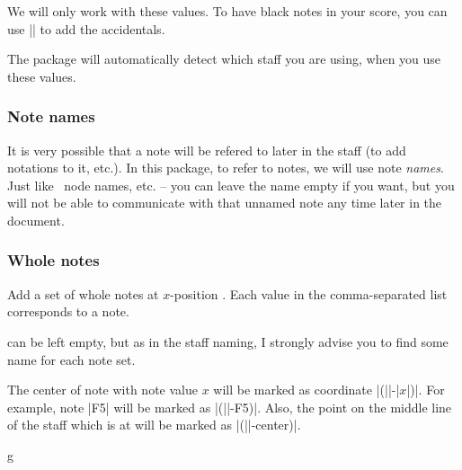 We will only work with these values. To have black notes in your score, you can 
use |\tmappendaccidental| to add the accidentals.

The package will automatically detect which staff you are using, when you use 
these values.
\subsubsection{Note names}\label{sec:music-notes:commands:note-names}
It is very possible that a note will be refered to later in the staff (to add 
notations to it, etc.). In this package, to refer to notes, we will use note 
\emph{names}. Just like \tikzname\ node names, etc. -- you can leave the name 
empty if you want, but you will not be able to communicate with that unnamed note 
any time later in the document.
\subsubsection{Whole notes}\label{sec:music-notes:commands:whole}
\begin{command}{\tmwhole{}}
  Add a set of whole notes at $x$-position . Each value in the 
  comma-separated list  corresponds to a note.

   can be left empty, but as in the staff naming, I strongly advise 
  you to find some name for each note set.

  The center of note with note value $x$ will be marked as coordinate 
  |(||-|$x$|)|. For example, note |F5| will be marked as 
  |(||-F5)|. Also, the point on the middle line of the staff which is 
  at  will be marked as |(||-center)|.
\end{command}
\begin{codeexample}[]
\begin{tmline}
\begin{tmstaff}{g}{}
\end{tmstaff}
\end{tmline}
\end{codeexample}
